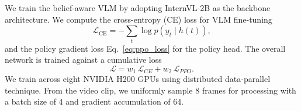 \documentclass[letterpaper, 10 pt, conference]{ieeeconf}  %
\begin{document}
We train the belief-aware VLM by adopting InternVL-2B \cite{chen2024internvl} as the backbone  architecture.  We compute the cross-entropy (CE) loss for VLM fine-tuning 
\begin{equation}
\mathcal{L}_{\text{CE}} = - \sum_t \log p(y_t \mid h(t)),
\end{equation}
and the policy gradient loss Eq.~\ref{eq:ppo_loss} for the policy head. The overall network is trained against a cumulative loss  
\[
\mathcal{L} = w_1 \,\mathcal{L}_{CE}+w_2\,\mathcal{L}_{PPO}.
\]
We train across eight NVIDIA H200 GPUs using distributed data-parallel technique.  From the video clip, we uniformly sample 8 frames for processing with a batch size of 4 and gradient accumulation of 64. 











\end{document}
